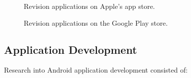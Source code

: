 \documentclass{article}
\begin{document}
\begin{figure}[H]
	\centering
	\caption{Revision applications on Apple's app store.}
	\label{figure:appStoreApps}
\end{figure}
	
	\hfill
\begin{figure}[H]
	\centering
	\caption{Revision applications on the Google Play store.}
	\label{figure:playStoreApps}
\end{figure}

\subsection{Application Development}

Research into Android application development consisted of: 
\end{document}
